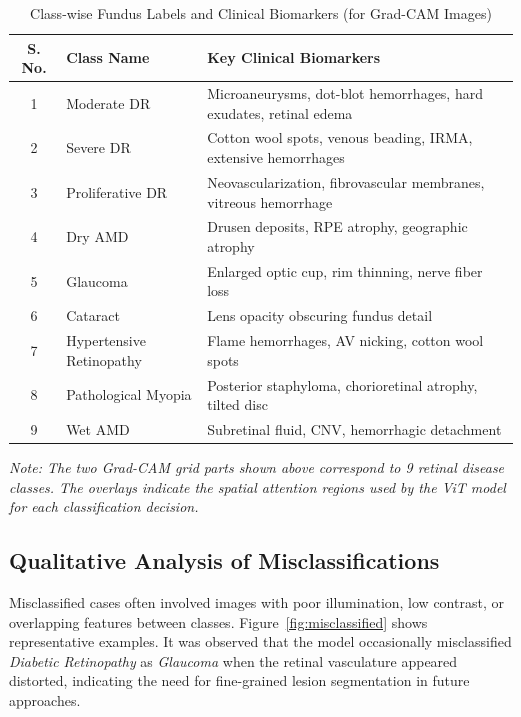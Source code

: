 \documentclass[a4paper,12pt]{report}
\begin{document}
\begin{table}[h!]
\centering
\caption{Class-wise Fundus Labels and Clinical Biomarkers (for Grad-CAM Images)}
\begin{tabular}{|c|l|p{9cm}|}
\hline
\textbf{S. No.} & \textbf{Class Name} & \textbf{Key Clinical Biomarkers} \\
\hline
1 & Moderate DR & Microaneurysms, dot-blot hemorrhages, hard exudates, retinal edema \\
2 & Severe DR & Cotton wool spots, venous beading, IRMA, extensive hemorrhages \\
3 & Proliferative DR & Neovascularization, fibrovascular membranes, vitreous hemorrhage \\
4 & Dry AMD & Drusen deposits, RPE atrophy, geographic atrophy \\
5 & Glaucoma & Enlarged optic cup, rim thinning, nerve fiber loss \\
6 & Cataract & Lens opacity obscuring fundus detail \\
7 & Hypertensive Retinopathy & Flame hemorrhages, AV nicking, cotton wool spots \\
8 & Pathological Myopia & Posterior staphyloma, chorioretinal atrophy, tilted disc \\
9 & Wet AMD & Subretinal fluid, CNV, hemorrhagic detachment \\
\hline
\end{tabular}
\end{table}

\textit{Note: The two Grad-CAM grid parts shown above correspond to 9 retinal disease classes. The overlays indicate the spatial attention regions used by the ViT model for each classification decision.}






\subsection{Qualitative Analysis of Misclassifications}

Misclassified cases often involved images with poor illumination, low contrast, or overlapping features between classes. Figure~\ref{fig:misclassified} shows representative examples. It was observed that the model occasionally misclassified \textit{Diabetic Retinopathy} as \textit{Glaucoma} when the retinal vasculature appeared distorted, indicating the need for fine-grained lesion segmentation in future approaches.
\end{document}

